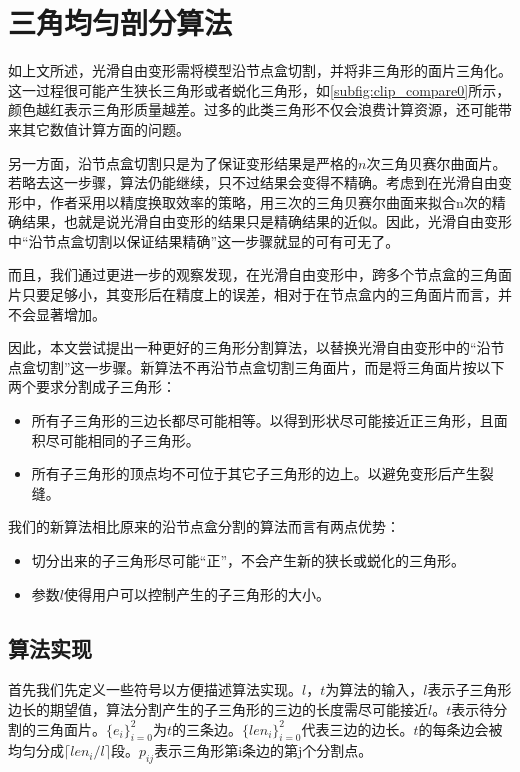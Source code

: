
\chapter{三角均匀剖分算法}
如上文所述，光滑自由变形需将模型沿节点盒切割，并将非三角形的面片三角化。这一过程很可能产生狭长三角形或者蜕化三角形，如\autoref{subfig:clip_compare0}所示，颜色越红表示三角形质量越差。过多的此类三角形不仅会浪费计算资源，还可能带来其它数值计算方面的问题。

另一方面，沿节点盒切割只是为了保证变形结果是严格的$n$次三角贝赛尔曲面片。若略去这一步骤，算法仍能继续，只不过结果会变得不精确。考虑到在光滑自由变形中，作者采用以精度换取效率的策略，用三次的三角贝赛尔曲面来拟合n次的精确结果，也就是说光滑自由变形的结果只是精确结果的近似。因此，光滑自由变形中“沿节点盒切割以保证结果精确”这一步骤就显的可有可无了。

而且，我们通过更进一步的观察发现，在光滑自由变形中，跨多个节点盒的三角面片只要足够小，其变形后在精度上的误差，相对于在节点盒内的三角面片而言，并不会显著增加。

因此，本文尝试提出一种更好的三角形分割算法，以替换光滑自由变形中的“沿节点盒切割”这一步骤。新算法不再沿节点盒切割三角面片，而是将三角面片按以下两个要求分割成子三角形：
\begin{itemize}
    \item 所有子三角形的三边长都尽可能相等。以得到形状尽可能接近正三角形，且面积尽可能相同的子三角形。
    \item 所有子三角形的顶点均不可位于其它子三角形的边上。以避免变形后产生裂缝。
\end{itemize}

我们的新算法相比原来的沿节点盒分割的算法而言有两点优势：
\begin{itemize}
        \item 切分出来的子三角形尽可能“正”，不会产生新的狭长或蜕化的三角形。
        \item 参数$l$使得用户可以控制产生的子三角形的大小。
\end{itemize}


\section{算法实现}
首先我们先定义一些符号以方便描述算法实现。$l$，$t$为算法的输入，$l$表示子三角形边长的期望值，算法分割产生的子三角形的三边的长度需尽可能接近$l$。$t$表示待分割的三角面片。$\{e_i\}^{2}_{i=0}$为$t$的三条边。$\{len_i\}^{2}_{i=0}$代表三边的边长。$t$的每条边会被均匀分成$\lceil len_i/l \rceil$段。$p_{ij}$表示三角形第i条边的第j个分割点。

